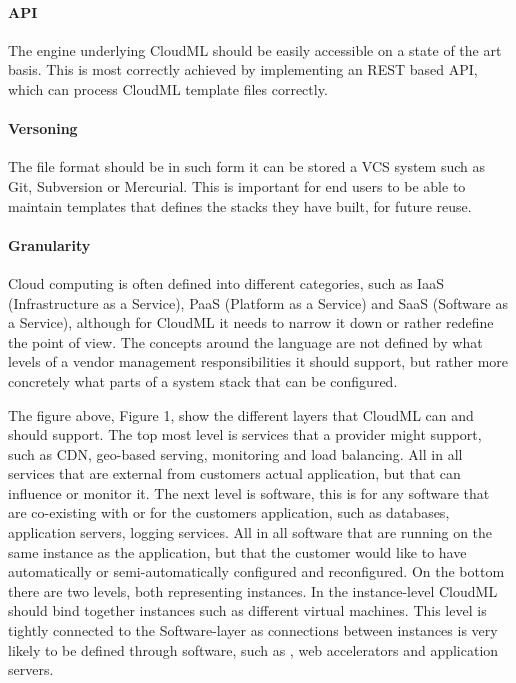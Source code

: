 \paragraph{API}
The engine underlying CloudML should be easily accessible on a state of the art basis. 
This is most correctly achieved by implementing an REST based API, which can process CloudML template files correctly. 

\paragraph{Versoning}
The file format should be in such form it can be stored a VCS system such as Git, Subversion or Mercurial. 
This is important for end users to be able to maintain templates that defines the stacks they have built, for future reuse.

\paragraph{Granularity}
Cloud computing is often defined into different categories, such as IaaS (Infrastructure as a Service), 
PaaS (Platform as a Service) and SaaS (Software as a Service), although for CloudML it needs to narrow it down or rather redefine the point of view.
The concepts around the language are not defined by what levels of a vendor management responsibilities it should support, 
but rather more concretely what parts of a system stack that can be configured.

The figure above, Figure 1, show the different layers that CloudML can and should support. 
The top most level is services that a provider might support, such as CDN, geo-based serving, monitoring and load balancing. 
All in all services that are external from customers actual application, but that can influence or monitor it.
The next level is software, this is for any software that are co-existing with or for the customers application, 
such as databases, application servers, logging services. All in all software that are running on the same instance as the application, 
but that the customer would like to have automatically or semi-automatically configured and reconfigured.
On the bottom there are two levels, both representing instances. In the instance-level CloudML should bind together instances 
such as different virtual machines. This level is tightly connected to the Software-layer as connections between instances 
is very likely to be defined through software, such as , web accelerators and application servers.
